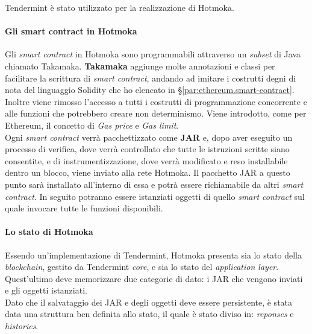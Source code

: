 \noindent Tendermint è stato utilizzato per la realizzazione di Hotmoka.

\paragraph{Gli smart contract in Hotmoka}
Gli \textit{smart contract} in Hotmoka sono programmabili attraverso un \textit{subset} di Java chiamato Takamaka. \textbf{Takamaka} aggiunge molte annotazioni e classi per facilitare la scrittura di \textit{smart contract}, andando ad imitare i costrutti degni di nota del linguaggio Solidity che ho elencato in §\ref{par:ethereum.smart-contract}. Inoltre viene rimosso l'accesso a tutti i costrutti di programmazione concorrente e alle funzioni che potrebbero creare non determinismo. Viene introdotto, come per Ethereum, il concetto di \textit{Gas price} e \textit{Gas limit}. \\

Ogni \textit{smart contract} verrà pacchettizzato come \textbf{JAR} e, dopo aver eseguito un processo di verifica, dove verrà controllato che tutte le istruzioni scritte siano consentite, e di instrumentizzazione, dove verrà modificato e reso installabile dentro un blocco, viene inviato alla rete Hotmoka.  
Il pacchetto JAR a questo punto sarà installato all'interno di essa e potrà essere richiamabile da altri \textit{smart contract}.
In seguito potranno essere istanziati oggetti di quello \textit{smart contract} sul quale invocare tutte le funzioni disponibili.


\paragraph{Lo stato di Hotmoka}
Essendo un'implementazione di Tendermint, Hotmoka presenta sia lo stato della \textit{blockchain}, gestito da Tendermint \textit{core}, e sia lo stato del \textit{application layer}. Quest'ultimo deve memorizzare due categorie di dato: i JAR che vengono inviati e gli oggetti istanziati. \\

Dato che il salvataggio dei JAR e degli oggetti deve essere persistente, è stata data una struttura ben definita allo stato, il quale è stato diviso in: \textit{reponses} e \textit{histories}.

